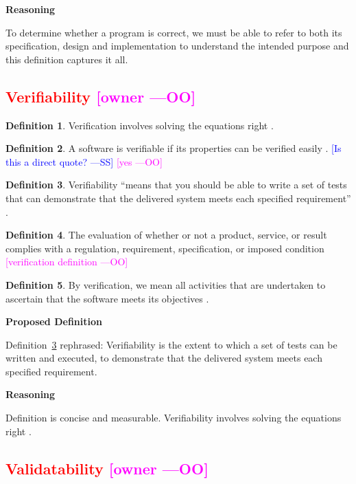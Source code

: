 \documentclass[letterpaper,cleveref]{lipics-v2019}
\newcommand{\authornote}[3]{\textcolor{#1}{[#3 ---#2]}}
\newcommand{\authornote}[3]{}
\newcommand{\wss}[1]{\authornote{blue}{SS}{#1}} %
\newcommand{\oo}[1]{\authornote{magenta}{OO}{#1}} %
\newcommand{\notdone}[1]{\textcolor{red}{#1}}
\theoremstyle{definition}
\newtheorem{defn}{Definition}
\begin{document}
\noindent \textbf{Reasoning}

To determine whether a program is correct, we must be able to refer to both its
specification, design and implementation to understand the intended purpose and
this definition captures it all.

\subsection{\notdone{Verifiability} \oo{owner}}

\begin{defn}
	Verification involves solving the equations right \citep[p.~23]{Roache1998}.
\end{defn}

\begin{defn}
  A software is verifiable if its properties can be verified easily
  \citep{GhezziEtAl2003}.  \wss{Is this a direct quote?} \oo{yes}
\end{defn}

\begin{defn} \label{Defn_Verifiability1}
Verifiability ``means that you should be able to write a set of tests that can
demonstrate that the delivered system meets each specified requirement'' \citep{sommerville}.	
\end{defn}

\begin{defn}
	The evaluation of whether or not a product, service, or result complies with
	a regulation, requirement, specification, or imposed condition \citep{project2017guide}
	\oo {verification definition}
\end{defn}

\begin{defn}
	By verification, we mean all activities that are undertaken to ascertain that the
	software meets its objectives \citep{GhezziEtAl2003}.
\end{defn}
\noindent \textbf{Proposed Definition}

Definition~\ref{Defn_Verifiability1} rephrased:
Verifiability is the extent to which a set of tests can be written and executed, to demonstrate
that the delivered system meets each specified requirement.


\noindent \textbf{Reasoning} 

Definition is concise and measurable.  Verifiability involves solving the
equations right \citep[p.~23]{Roache1998}.

\subsection{\notdone{Validatability} \oo{owner}}
\end{document}
